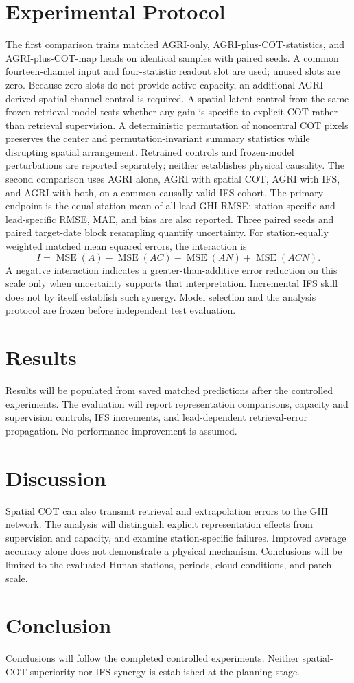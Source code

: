 \documentclass[11pt]{article}
\begin{document}
\section{Experimental Protocol}
The first comparison trains matched AGRI-only, AGRI-plus-COT-statistics, and AGRI-plus-COT-map heads on identical samples with paired seeds. A common fourteen-channel input and four-statistic readout slot are used; unused slots are zero. Because zero slots do not provide active capacity, an additional AGRI-derived spatial-channel control is required. A spatial latent control from the same frozen retrieval model tests whether any gain is specific to explicit COT rather than retrieval supervision.
A deterministic permutation of noncentral COT pixels preserves the center and permutation-invariant summary statistics while disrupting spatial arrangement. Retrained controls and frozen-model perturbations are reported separately; neither establishes physical causality.
The second comparison uses AGRI alone, AGRI with spatial COT, AGRI with IFS, and AGRI with both, on a common causally valid IFS cohort. The primary endpoint is the equal-station mean of all-lead GHI RMSE; station-specific and lead-specific RMSE, MAE, and bias are also reported. Three paired seeds and paired target-date block resampling quantify uncertainty. For station-equally weighted matched mean squared errors, the interaction is
\begin{equation}
I=\operatorname{MSE}(A)-\operatorname{MSE}(AC)-\operatorname{MSE}(AN)+\operatorname{MSE}(ACN).
\end{equation}
A negative interaction indicates a greater-than-additive error reduction on this scale only when uncertainty supports that interpretation. Incremental IFS skill does not by itself establish such synergy. Model selection and the analysis protocol are frozen before independent test evaluation.
\section{Results}
Results will be populated from saved matched predictions after the controlled experiments. The evaluation will report representation comparisons, capacity and supervision controls, IFS increments, and lead-dependent retrieval-error propagation. No performance improvement is assumed.
\section{Discussion}
Spatial COT can also transmit retrieval and extrapolation errors to the GHI network. The analysis will distinguish explicit representation effects from supervision and capacity, and examine station-specific failures. Improved average accuracy alone does not demonstrate a physical mechanism. Conclusions will be limited to the evaluated Hunan stations, periods, cloud conditions, and patch scale.
\section{Conclusion}
Conclusions will follow the completed controlled experiments. Neither spatial-COT superiority nor IFS synergy is established at the planning stage.
\end{document}
